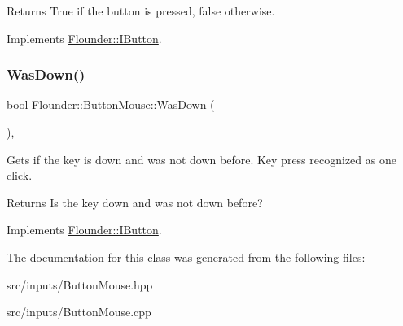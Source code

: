 \begin{DoxyReturn}{Returns}
True if the button is pressed, false otherwise. 
\end{DoxyReturn}


Implements \hyperlink{class_flounder_1_1_i_button_a264519250d835422748bcc1af9be38e3}{Flounder\+::\+I\+Button}.

\mbox{\label{class_flounder_1_1_button_mouse_ae64500e920907de796d8e57a07c9fef0}} 
\subsubsection{\texorpdfstring{Was\+Down()}{WasDown()}}
{\footnotesize\ttfamily bool Flounder\+::\+Button\+Mouse\+::\+Was\+Down (\begin{DoxyParamCaption}{ }\end{DoxyParamCaption})\hspace{0.3cm}{\ttfamily [override]}, {\ttfamily [virtual]}}



Gets if the key is down and was not down before. Key press recognized as one click. 

\begin{DoxyReturn}{Returns}
Is the key down and was not down before? 
\end{DoxyReturn}


Implements \hyperlink{class_flounder_1_1_i_button_af31c7669349991fe6a57beb8bd42c5b2}{Flounder\+::\+I\+Button}.



The documentation for this class was generated from the following files\+:\begin{DoxyCompactItemize}
\item 
src/inputs/Button\+Mouse.\+hpp\item 
src/inputs/Button\+Mouse.\+cpp\end{DoxyCompactItemize}
